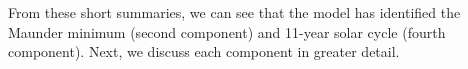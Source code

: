 \documentclass[letterpaper]{article}
\begin{document}
From these short summaries, we can see that the model has identified the Maunder minimum (second component) and 11-year solar cycle (fourth component).
Next, we discuss each component in greater detail.

%
%
%
%
\end{document}
